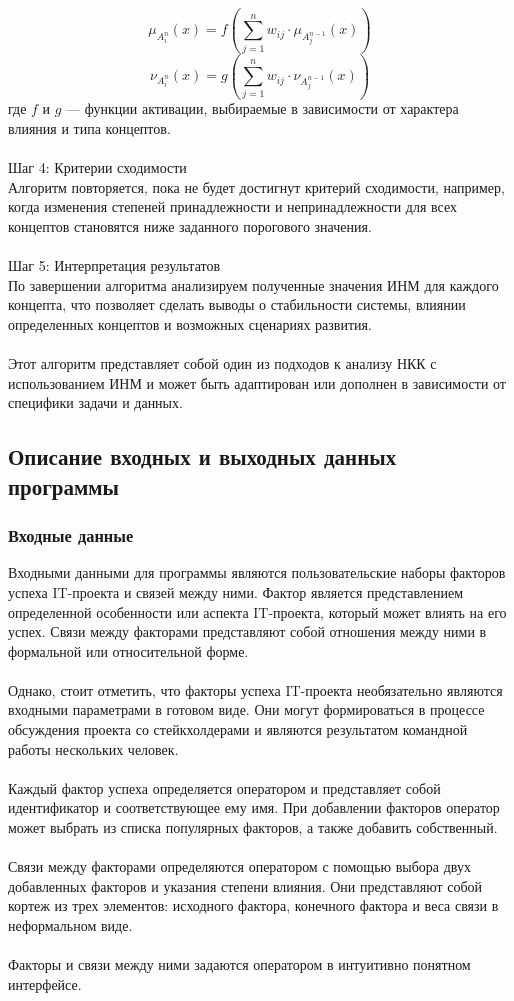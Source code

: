 \documentclass{article}
\begin{document}
    $$\mu_{A_i^n}(x) = f\left(\sum_{j=1}^n w_{ij} \cdot \mu_{A_j^{n-1}}(x)\right)$$
    $$\nu_{A_i^n}(x) = g\left(\sum_{j=1}^n w_{ij} \cdot \nu_{A_j^{n-1}}(x)\right)$$
    где $f$ и $g$ — функции активации, выбираемые в зависимости от характера влияния и типа концептов.\\
    ~\\
    Шаг 4: Критерии сходимости\\
    Алгоритм повторяется, пока не будет достигнут критерий сходимости, например, когда изменения степеней принадлежности и непринадлежности для всех концептов становятся ниже заданного порогового значения.\\
    ~\\
    Шаг 5: Интерпретация результатов\\
    По завершении алгоритма анализируем полученные значения ИНМ для каждого концепта, что позволяет сделать выводы о стабильности системы, влиянии определенных концептов и возможных сценариях развития.\\
    ~\\
    Этот алгоритм представляет собой один из подходов к анализу НКК с использованием ИНМ и может быть адаптирован или дополнен в зависимости от специфики задачи и данных.\\
    \subsection {Описание входных и выходных данных программы}

    \subsubsection{Входные данные}
    Входными данными для программы являются пользовательские наборы факторов успеха IT-проекта и связей между ними. Фактор является представлением определенной особенности или аспекта IT-проекта, который может влиять на его успех. Связи между факторами представляют собой отношения между ними в формальной или относительной форме.\\
    ~\\
    Однако, стоит отметить, что факторы успеха IT-проекта необязательно являются входными параметрами в готовом виде. Они могут формироваться в процессе обсуждения проекта со стейкхолдерами и являются результатом командной работы нескольких человек.\\
    ~\\
    Каждый фактор успеха определяется оператором и представляет собой идентификатор и соответствующее ему имя. При добавлении факторов оператор может выбрать из списка популярных факторов, а также добавить собственный.\\
    ~\\
    Связи между факторами определяются оператором с помощью выбора двух добавленных факторов и указания степени влияния. Они представляют собой кортеж из трех элементов: исходного фактора, конечного фактора и веса связи в неформальном виде.\\
    ~\\
    Факторы и связи между ними задаются оператором в интуитивно понятном интерфейсе.
\end{document}
